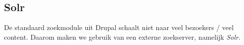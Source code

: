 \subsection{Solr}\label{solr}
De standaard zoekmodule uit Drupal schaalt niet naar veel bezoekers / veel content. Daarom maken we gebruik van een externe zoekserver, namelijk \textit{Solr}. 
